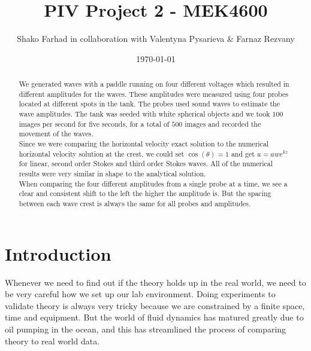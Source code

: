 \documentclass[english,a4paper,12pt]{article}
\title{PIV Project 2 - MEK4600}
\author{Shako Farhad in collaboration with Valentyna Pysarieva \& Farnaz Rezvany}
\date{\today}
\begin{document}
 
 
\lstset{style=mystyle}

\maketitle

\begin{abstract}
We generated waves with a paddle running on four different voltages which resulted in different amplitudes for the waves. These amplitudes were measured using four probes located at different spots in the tank. The probes used sound waves to estimate the wave amplitudes. The tank was seeded with white spherical objects and we took $100$ images per second for five seconds, for a total of $500$ images and recorded the movement of the waves. \\ 

Since we were comparing the horizontal velocity exact solution to the numerical horizontal velocity solution at the crest, we could set $\cos(\theta) = 1$ and get $u=awe^{kz}$ for linear, second order Stokes and third order Stokes waves. All of the numerical results were very similar in shape to the analytical solution.\\

When comparing the four different amplitudes from a single probe at a time, we see a clear and consistent shift to the left the higher the amplitude is. But the spacing between each wave crest is always the same for all probes and amplitudes.


\end{abstract}

\section*{Introduction}
Whenever we need to find out if the theory holds up in the real world, we need to be very careful how we set up our lab environment. Doing experiments to validate theory is always very tricky because we are constrained by a finite space, time and equipment. But the world of fluid dynamics has matured greatly due to oil pumping in the ocean, and this has streamlined the process of comparing theory to real world data.
\end{document}

